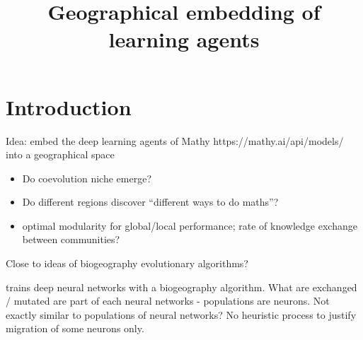 \documentclass{article}
\title{Geographical embedding of learning agents}
\author{}
\date{}
\begin{document}
\maketitle

\section{Introduction}

Idea: embed the deep learning agents of Mathy https://mathy.ai/api/models/ into a geographical space 

\begin{itemize}
    \item Do coevolution niche emerge?
    \item Do different regions discover ``different ways to do maths''?
    \item optimal modularity for global/local performance; rate of knowledge exchange between communities?
\end{itemize}

Close to ideas of biogeography evolutionary algorithms?

\cite{mirjalili2014let} trains deep neural networks with a biogeography algorithm. What are exchanged / mutated are part of each neural networks - populations are neurons. Not exactly similar to populations of neural networks? No heuristic process to justify migration of some neurons only.
\end{document}
